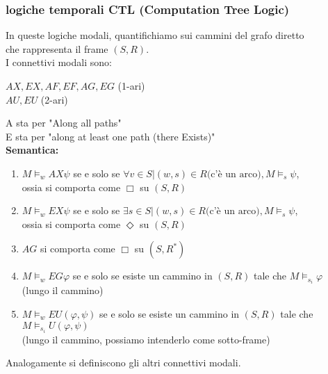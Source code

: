 \documentclass[a4paper,12pt]{article}
\theoremstyle{def}
\theoremstyle{prop}
\theoremstyle{esempio}
\theoremstyle{dimostrazione}
\theoremstyle{teo}
\theoremstyle{osservazione}
\begin{document}
\subsubsection{logiche temporali CTL (Computation Tree Logic)}
In queste logiche modali, quantifichiamo sui cammini del grafo diretto\\
che rappresenta il frame \((S,R)\).\\
I connettivi modali sono:
\begin{center}
	\(AX, EX, AF, EF, AG, EG\) (1-ari)\\
	\(AU, EU\) (2-ari)
\end{center}
A sta per "Along all paths"\\
E sta per "along at least one path (there Exists)"\\
\textbf{Semantica:}
\begin{enumerate}
	\item \(M \vDash_w AX \psi \) se e solo se \(\forall v \in S | (w,s) \in R \text{(c'è un arco)} , M \vDash_s \psi\),\\
	      ossia si comporta come \(\Box\) su \((S,R)\)
	\item \(M \vDash_w EX \psi \) se e solo se \(\exists s \in S | (w,s) \in R \text{(c'è un arco)} , M \vDash_s \psi\),\\
	      ossia si comporta come \(\Diamond\) su \((S,R)\)
	\item \(AG\) si comporta come \(\Box\) su \((S,R^*)\)
	\item \(M \vDash_w EG \varphi\) se e solo se esiste un cammino in \((S,R)\) tale che \(M \vDash_{s_i} \varphi\)\\
	      (lungo il cammino)
	\item \(M \vDash_w EU (\varphi, \psi)\) se e solo se esiste un cammino in \((S,R)\) tale che \(M \vDash_{s_i} U(\varphi, \psi)\)\\
	      (lungo il cammino, possiamo intenderlo come sotto-frame)
\end{enumerate}
Analogamente si definiscono gli altri connettivi modali.
\end{document}
